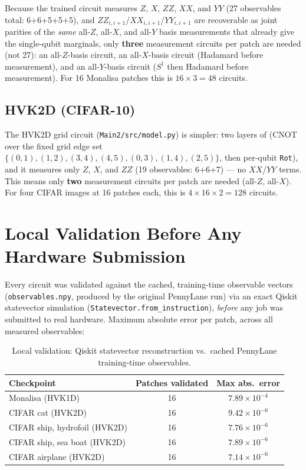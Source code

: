\documentclass[11pt]{article}
\begin{document}
Because the trained circuit measures $Z$, $X$, $ZZ$, $XX$, and $YY$ (27 observables total: 6+6+5+5+5), and $ZZ_{i,i+1}$/$XX_{i,i+1}$/$YY_{i,i+1}$ are recoverable as joint parities of the \emph{same} all-$Z$, all-$X$, and all-$Y$ basis measurements that already give the single-qubit marginals, only \textbf{three} measurement circuits per patch are needed (not 27): an all-$Z$-basis circuit, an all-$X$-basis circuit (Hadamard before measurement), and an all-$Y$-basis circuit ($S^\dagger$ then Hadamard before measurement). For 16 Monalisa patches this is $16\times3=48$ circuits.

\subsection{HVK2D (CIFAR-10)}
The HVK2D grid circuit (\texttt{Main2/src/model.py}) is simpler: two layers of (CNOT over the fixed grid edge set $\{(0,1),(1,2),(3,4),(4,5),(0,3),(1,4),(2,5)\}$, then per-qubit \texttt{Rot}), and it measures only $Z$, $X$, and $ZZ$ (19 observables: 6+6+7) --- no $XX$/$YY$ terms. This means only \textbf{two} measurement circuits per patch are needed (all-$Z$, all-$X$). For four CIFAR images at 16 patches each, this is $4\times16\times2=128$ circuits.

\section{Local Validation Before Any Hardware Submission}
Every circuit was validated against the cached, training-time observable vectors (\texttt{observables.npy}, produced by the original PennyLane run) via an exact Qiskit statevector simulation (\texttt{Statevector.from\_instruction}), \emph{before} any job was submitted to real hardware. Maximum absolute error per patch, across all measured observables:

\begin{table}[H]
\centering
\caption{Local validation: Qiskit statevector reconstruction vs.\ cached PennyLane training-time observables.}
\begin{tabular}{lcc}
\toprule
Checkpoint & Patches validated & Max abs.\ error \\
\midrule
Monalisa (HVK1D) & 16 & $7.89\times10^{-4}$ \\
CIFAR cat (HVK2D) & 16 & $9.42\times10^{-6}$ \\
CIFAR ship, hydrofoil (HVK2D) & 16 & $7.76\times10^{-6}$ \\
CIFAR ship, sea boat (HVK2D) & 16 & $7.89\times10^{-6}$ \\
CIFAR airplane (HVK2D) & 16 & $7.14\times10^{-6}$ \\
\bottomrule
\end{tabular}
\end{table}
\end{document}
